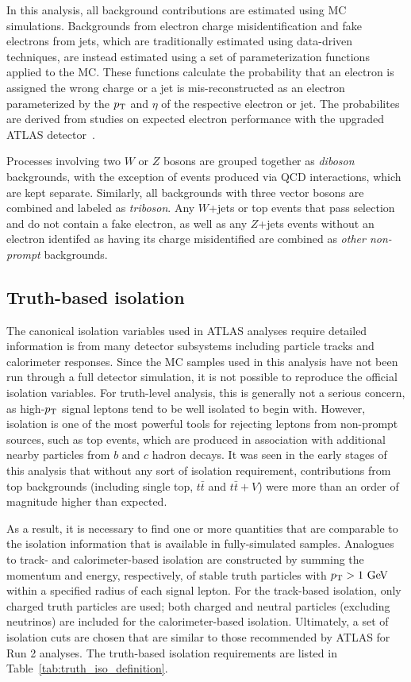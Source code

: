 In this analysis, all background contributions are estimated using MC simulations.
Backgrounds from electron charge misidentification and fake electrons from jets, which are traditionally estimated using data-driven techniques, are instead estimated using a set of parameterization functions applied to the MC.
These functions calculate the probability that an electron is assigned the wrong charge or a jet is mis-reconstructed as an electron parameterized by the $p_{\mathrm{T}}$ and $\eta$ of the respective electron or jet.
The probabilites are derived from studies on expected electron performance with the upgraded ATLAS detector~\cite{2016.upgrade-electron-performance}.

Processes involving two $W$ or $Z$ bosons are grouped together as \emph{diboson} backgrounds, with the exception of \ssww events produced via QCD interactions, which are kept separate.
Similarly, all backgrounds with three vector bosons are combined and labeled as \emph{triboson}.
Any $W$+jets or top events that pass selection and do not contain a fake electron, as well as any $Z$+jets events without an electron identifed as having its charge misidentified are combined as \emph{other non-prompt} backgrounds.

\subsection{Truth-based isolation}\label{sswwupgrade:isolation}
The canonical isolation variables used in ATLAS analyses require detailed information is from many detector subsystems including particle tracks and calorimeter responses.
Since the MC samples used in this analysis have not been run through a full detector simulation, it is not possible to reproduce the official isolation variables.
For truth-level analysis, this is generally not a serious concern, as high-$p_{\mathrm{T}}$ signal leptons tend to be well isolated to begin with.
However, isolation is one of the most powerful tools for rejecting leptons from non-prompt sources, such as top events, which are produced in association with additional nearby particles from $b$ and $c$ hadron decays.
It was seen in the early stages of this analysis that without any sort of isolation requirement, contributions from top backgrounds (including single top, $t\bar{t}$ and $t\bar{t}+V$) were more than an order of magnitude higher than expected.%

As a result, it is necessary to find one or more quantities that are comparable to the isolation information that is available in fully-simulated samples.
Analogues to track- and calorimeter-based isolation are constructed by summing the momentum and energy, respectively, of stable truth particles with $\pt > 1\gev$ within a specified radius of each signal lepton.
For the track-based isolation, only charged truth particles are used; both charged and neutral particles (excluding neutrinos) are included for the calorimeter-based isolation.
Ultimately, a set of isolation cuts are chosen that are similar to those recommended by ATLAS for Run 2 analyses.
The truth-based isolation requirements are listed in Table~\ref{tab:truth_iso_definition}.

